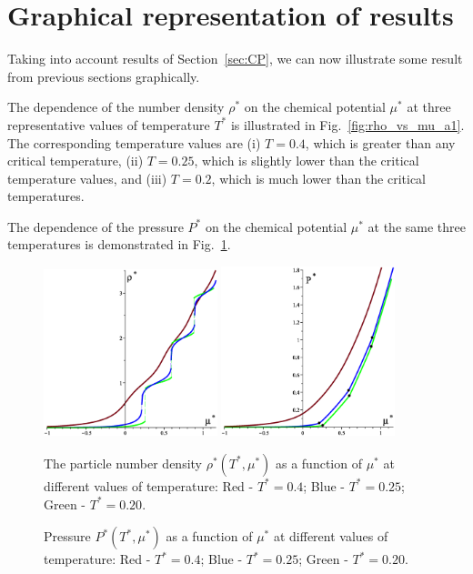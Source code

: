 \documentclass[12pt]{article}
\numberwithin{equation}{section}
\begin{document}
	
	\pagebreak
	\section{Graphical representation of results}
	
	Taking into account results of Section~\ref{sec:CP}, we can now illustrate some result from previous sections graphically. 
	
	The dependence of the number density $\rho^*$ on the chemical potential $\mu^*$ at three representative values of temperature $T^*$ is illustrated in Fig.~\ref{fig:rho_vs_mu_a1}. The corresponding temperature values are (i) $T=0.4$, which is greater than any critical temperature, (ii) $T=0.25$, which is slightly lower than the critical temperature values, and (iii) $T=0.2$, which is much lower than the critical temperatures.
	
	The dependence of the pressure $P^*$ on the chemical potential $\mu^*$ at the same three temperatures is demonstrated in Fig.~\ref{fig:p_vs_mu_a1}.
	
	\begin{figure}[htbp]
		\includegraphics[width=0.45\textwidth,angle=0]{images/rho_vs_mu_a1}
		\hfill
		\includegraphics[width=0.45\textwidth,angle=0]{images/p_vs_mu_a1}
		\\
		\parbox{0.45\textwidth}{\caption{\label{fig:rho_vs_mu_a1} The particle number density $\rho^*(T^*,\mu^*)$ as a function of $\mu^*$ at different values of temperature: Red - $T^*=0.4$; Blue - $T^*=0.25$; Green - $T^*=0.20$.}}
		\hfill
		\parbox{0.45\textwidth}{\caption{\label{fig:p_vs_mu_a1} Pressure $P^*(T^*,\mu^*)$ as a function of $\mu^*$ at different values of temperature: Red - $T^*=0.4$; Blue - $T^*=0.25$; Green - $T^*=0.20$.}}
	\end{figure}
	
\end{document}
